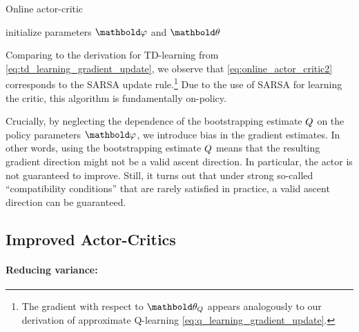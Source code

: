 \begin{algorithm}
  \caption{Online actor-critic}\label{alg:oac}
  initialize parameters $\vvarphi$ and $\vtheta$\;
\end{algorithm}

Comparing to the derivation for TD-learning from \cref{eq:td_learning_gradient_update}, we observe that \cref{eq:online_actor_critic2} corresponds to the SARSA update rule.\footnote{The gradient with respect to $\vtheta_Q$ appears analogously to our derivation of approximate Q-learning \eqref{eq:q_learning_gradient_update}.}
Due to the use of SARSA for learning the critic, this algorithm is fundamentally on-policy.

Crucially, by neglecting the dependence of the bootstrapping estimate $\fnQ$ on the policy parameters $\vvarphi$, we introduce bias in the gradient estimates.
In other words, using the bootstrapping estimate $\fnQ$ means that the resulting gradient direction might not be a valid ascent direction.
In particular, the actor is not guaranteed to improve.
Still, it turns out that under strong so-called ``compatibility conditions'' that are rarely satisfied in practice, a valid ascent direction can be guaranteed.

\subsection{Improved Actor-Critics}\label{sec:mfarl:actor_critc_methods:improved}

\paragraph{Reducing variance:}

